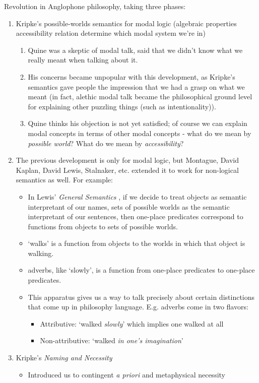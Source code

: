 Revolution in Anglophone philosophy, taking three phases:

\begin{enumerate}
    \item Kripke's possible-worlds semantics for modal logic (algebraic properties accessibility relation determine which modal system we're in) \begin{enumerate}
        \item Quine was a skeptic of modal talk, said that we didn't know what we really meant when talking about it.
        \item His concerns became unpopular with this development, as Kripke's semantics gave people the impression that we had a grasp on what we meant (in fact, alethic modal talk became the philosophical ground level for explaining other puzzling things (such as intentionality)).
        \item  Quine thinks his objection is not yet satisfied; of course we can explain modal concepts in terms of other modal concepts - what do we mean by \emph{possible world}? What do we mean by \emph{accessibility}?
    \end{enumerate}
    \item The previous development is only for modal logic, but Montague, David Kaplan, David Lewis, Stalnaker, etc. extended it to work for non-logical semantics as well. For example: \begin{itemize}
        \item In Lewis' \textit{General Semantics} \cite{lewis1976general}, if we decide to treat objects as semantic interpretant of our names, sets of possible worlds as the semantic interpretant of our sentences, then one-place predicates correspond to functions from objects to sets of possible worlds.
        \item `walks' is a function from objects to the worlds in which that object is walking.
        \item adverbs, like `slowly', is a function from one-place predicates to one-place predicates.
        \item This apparatus gives us a way to talk precisely about certain distinctions that come up in philosophy language. E.g. adverbs come in two flavors: \begin{itemize}
            \item Attributive: `walked \emph{slowly}' which implies one walked at all
            \item Non-attributive: `walked \emph{in one's imagination}'
    \end{itemize}
    \end{itemize}
    \item Kripke's \textit{Naming and Necessity} \cite{kripke1972naming} \begin{itemize}
    \item Introduced us to contingent \textit{a priori} and metaphysical necessity
    \end{itemize}
\end{enumerate}

